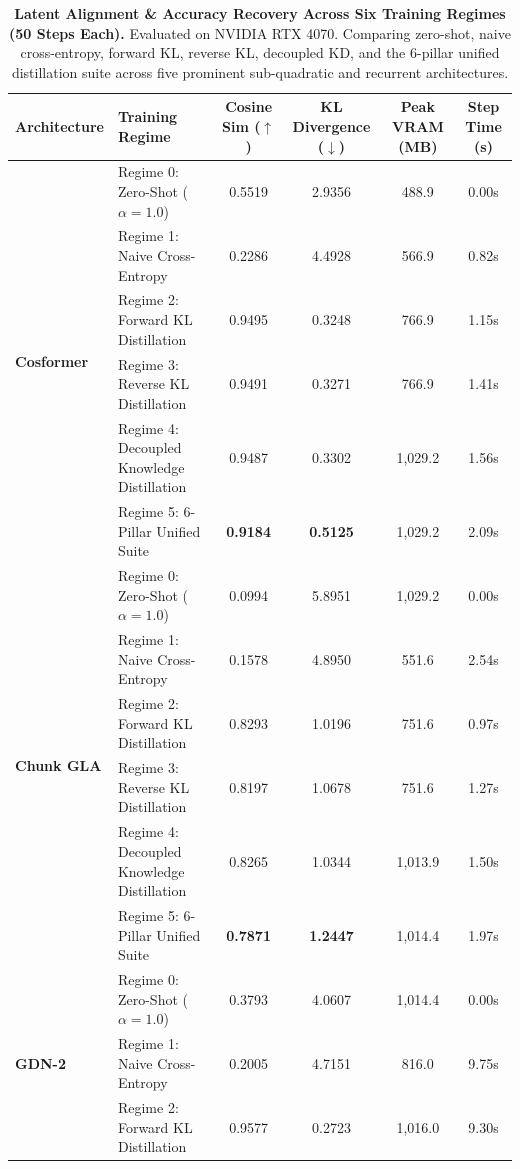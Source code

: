 \begin{table}[t]
\centering
\caption{\textbf{Latent Alignment \& Accuracy Recovery Across Six Training Regimes (50 Steps Each).}
Evaluated on NVIDIA RTX 4070. Comparing zero-shot, naive cross-entropy, forward KL, reverse KL, decoupled KD, and the 6-pillar unified distillation suite across five prominent sub-quadratic and recurrent architectures.}
\label{tab:kd_regimes}
\scriptsize
\setlength{\tabcolsep}{4.2pt}
\begin{tabular}{llcccc}
\toprule
\textbf{Architecture} & \textbf{Training Regime} & \textbf{Cosine Sim ($\uparrow$)} & \textbf{KL Divergence ($\downarrow$)} & \textbf{Peak VRAM (MB)} & \textbf{Step Time (s)} \\
\midrule
\multirow{6}{*}{\textbf{Cosformer}} & Regime 0: Zero-Shot ($\alpha=1.0$) & 0.5519 & 2.9356 & 488.9 & 0.00s \\
 & Regime 1: Naive Cross-Entropy & 0.2286 & 4.4928 & 566.9 & 0.82s \\
 & Regime 2: Forward KL Distillation & 0.9495 & 0.3248 & 766.9 & 1.15s \\
 & Regime 3: Reverse KL Distillation & 0.9491 & 0.3271 & 766.9 & 1.41s \\
 & Regime 4: Decoupled Knowledge Distillation & 0.9487 & 0.3302 & 1,029.2 & 1.56s \\
 & Regime 5: 6-Pillar Unified Suite & \textbf{0.9184} & \textbf{0.5125} & 1,029.2 & 2.09s \\
\midrule
\multirow{6}{*}{\textbf{Chunk GLA}} & Regime 0: Zero-Shot ($\alpha=1.0$) & 0.0994 & 5.8951 & 1,029.2 & 0.00s \\
 & Regime 1: Naive Cross-Entropy & 0.1578 & 4.8950 & 551.6 & 2.54s \\
 & Regime 2: Forward KL Distillation & 0.8293 & 1.0196 & 751.6 & 0.97s \\
 & Regime 3: Reverse KL Distillation & 0.8197 & 1.0678 & 751.6 & 1.27s \\
 & Regime 4: Decoupled Knowledge Distillation & 0.8265 & 1.0344 & 1,013.9 & 1.50s \\
 & Regime 5: 6-Pillar Unified Suite & \textbf{0.7871} & \textbf{1.2447} & 1,014.4 & 1.97s \\
\midrule
\multirow{6}{*}{\textbf{GDN-2}} & Regime 0: Zero-Shot ($\alpha=1.0$) & 0.3793 & 4.0607 & 1,014.4 & 0.00s \\
 & Regime 1: Naive Cross-Entropy & 0.2005 & 4.7151 & 816.0 & 9.75s \\
 & Regime 2: Forward KL Distillation & 0.9577 & 0.2723 & 1,016.0 & 9.30s \\

\end{tabular}
\end{table}
